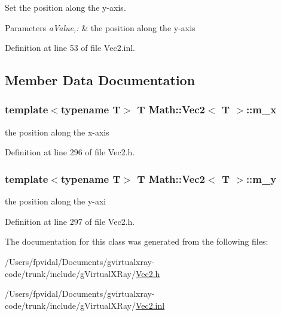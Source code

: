 Set the position along the y-\/axis. 


\begin{DoxyParams}{Parameters}
{\em aValue,:} & the position along the y-\/axis \\
\hline
\end{DoxyParams}


Definition at line 53 of file Vec2.inl.



\subsection{Member Data Documentation}
\hypertarget{class_math_1_1_vec2_ae7e5f6fb13e2a5ef8e0e7aa5a373f18c}{
\subsubsection[{m\_\-x}]{\setlength{\rightskip}{0pt plus 5cm}template$<$typename T$>$ T {\bf Math::Vec2}$<$ T $>$::{\bf m\_\-x}}}
\label{class_math_1_1_vec2_ae7e5f6fb13e2a5ef8e0e7aa5a373f18c}


the position along the x-\/axis 



Definition at line 296 of file Vec2.h.

\hypertarget{class_math_1_1_vec2_abd88545de9b57b06d6ebbdffa4824913}{
\subsubsection[{m\_\-y}]{\setlength{\rightskip}{0pt plus 5cm}template$<$typename T$>$ T {\bf Math::Vec2}$<$ T $>$::{\bf m\_\-y}}}
\label{class_math_1_1_vec2_abd88545de9b57b06d6ebbdffa4824913}


the position along the y-\/axi 



Definition at line 297 of file Vec2.h.



The documentation for this class was generated from the following files:\begin{DoxyCompactItemize}
\item 
/Users/fpvidal/Documents/gvirtualxray-\/code/trunk/include/gVirtualXRay/\hyperlink{_vec2_8h}{Vec2.h}\item 
/Users/fpvidal/Documents/gvirtualxray-\/code/trunk/include/gVirtualXRay/\hyperlink{_vec2_8inl}{Vec2.inl}\end{DoxyCompactItemize}
